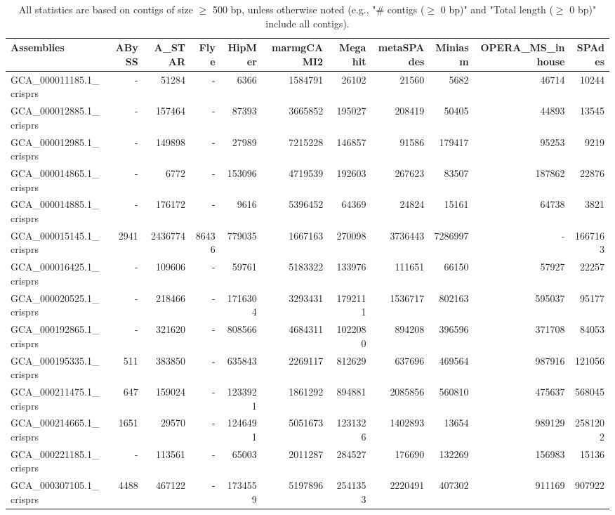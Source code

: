 \documentclass[12pt,a4paper]{article}
\begin{document}
\begin{table}[ht]
\begin{center}
\caption{All statistics are based on contigs of size $\geq$ 500 bp, unless otherwise noted (e.g., "\# contigs ($\geq$ 0 bp)" and "Total length ($\geq$ 0 bp)" include all contigs).}
\begin{tabular}{|l*{10}{|r}|}
\hline
Assemblies & ABySS & A\_STAR & Flye & HipMer & marmgCAMI2 & Megahit & metaSPAdes & Miniasm & OPERA\_MS\_inhouse & SPAdes \\ \hline
GCA\_000011185.1\_crisprs & - & 51284 & - & 6366 & 1584791 & 26102 & 21560 & 5682 & 46714 & 10244 \\ \hline
GCA\_000012885.1\_crisprs & - & 157464 & - & 87393 & 3665852 & 195027 & 208419 & 50405 & 44893 & 13545 \\ \hline
GCA\_000012985.1\_crisprs & - & 149898 & - & 27989 & 7215228 & 146857 & 91586 & 179417 & 95253 & 9219 \\ \hline
GCA\_000014865.1\_crisprs & - & 6772 & - & 153096 & 4719539 & 192603 & 267623 & 83507 & 187862 & 22876 \\ \hline
GCA\_000014885.1\_crisprs & - & 176172 & - & 9616 & 5396452 & 64369 & 24824 & 15161 & 64738 & 3821 \\ \hline
GCA\_000015145.1\_crisprs & 2941 & 2436774 & 86436 & 779035 & 1667163 & 270098 & 3736443 & 7286997 & - & 1667163 \\ \hline
GCA\_000016425.1\_crisprs & - & 109606 & - & 59761 & 5183322 & 133976 & 111651 & 66150 & 57927 & 22257 \\ \hline
GCA\_000020525.1\_crisprs & - & 218466 & - & 1716304 & 3293431 & 1792111 & 1536717 & 802163 & 595037 & 95177 \\ \hline
GCA\_000192865.1\_crisprs & - & 321620 & - & 808566 & 4684311 & 1022080 & 894208 & 396596 & 371708 & 84053 \\ \hline
GCA\_000195335.1\_crisprs & 511 & 383850 & - & 635843 & 2269117 & 812629 & 637696 & 469564 & 987916 & 121056 \\ \hline
GCA\_000211475.1\_crisprs & 647 & 159024 & - & 1233921 & 1861292 & 894881 & 2085856 & 560810 & 475637 & 568045 \\ \hline
GCA\_000214665.1\_crisprs & 1651 & 29570 & - & 1246491 & 5051673 & 1231326 & 1402893 & 13654 & 989129 & 2581202 \\ \hline
GCA\_000221185.1\_crisprs & - & 113561 & - & 65003 & 2011287 & 284527 & 176690 & 132269 & 156983 & 15136 \\ \hline
GCA\_000307105.1\_crisprs & 4488 & 467122 & - & 1734559 & 5197896 & 2541353 & 2220491 & 407302 & 911169 & 907922 \\ \hline

\end{tabular}
\end{center}
\end{table}
\end{document}
